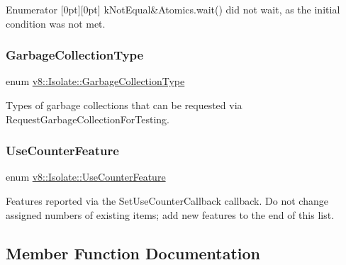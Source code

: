 \begin{DoxyEnumFields}{Enumerator}
[0pt][0pt]{}\mbox{\label{classv8_1_1Isolate_aa4cfd46a1a22b1ec8fd061c7bbb8b331aaecc9e24729e99eb5747c4e4d8eaffe0}} 
k\+Not\+Equal&{\ttfamily Atomics.\+wait()} did not wait, as the initial condition was not met. \\
\hline

\end{DoxyEnumFields}
\mbox{\label{classv8_1_1Isolate_a5ae00cc99d8aca148c6f5f9698c432c9}} 
\subsubsection{\texorpdfstring{Garbage\+Collection\+Type}{GarbageCollectionType}}
{\footnotesize\ttfamily enum \mbox{\hyperlink{classv8_1_1Isolate_a5ae00cc99d8aca148c6f5f9698c432c9}{v8\+::\+Isolate\+::\+Garbage\+Collection\+Type}}}

Types of garbage collections that can be requested via Request\+Garbage\+Collection\+For\+Testing. \mbox{\label{classv8_1_1Isolate_aed6909379c3f2820cb3084710b73385d}} 
\subsubsection{\texorpdfstring{Use\+Counter\+Feature}{UseCounterFeature}}
{\footnotesize\ttfamily enum \mbox{\hyperlink{classv8_1_1Isolate_aed6909379c3f2820cb3084710b73385d}{v8\+::\+Isolate\+::\+Use\+Counter\+Feature}}}

Features reported via the Set\+Use\+Counter\+Callback callback. Do not change assigned numbers of existing items; add new features to the end of this list. 

\subsection{Member Function Documentation}
\mbox{\label{classv8_1_1Isolate_a1affdbf27486aa4c6a1ecae9997de98e}} 
